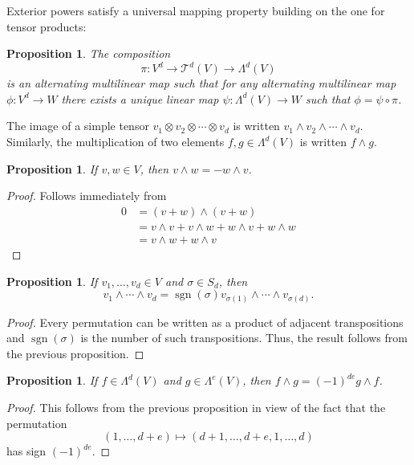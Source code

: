 \documentclass[12pt]{article}
\theoremstyle{plain}
\newtheorem{proposition}[theorem]{Proposition}
\theoremstyle{definition}
\theoremstyle{remark}
\numberwithin{equation}{section}
\begin{document}
Exterior powers satisfy a universal mapping property building on the
one for tensor products:

\begin{proposition}
The composition
\[
\pi : V^d \to \mathcal{T}^d(V) \to \Lambda^d(V)
\]
is an alternating multilinear map such that for any
alternating multilinear map
$\phi : V^d \to W$ there exists a unique linear map
$\psi : \Lambda^d(V) \to W$
such that
$\phi = \psi \circ \pi$.
\end{proposition}

The image of a simple tensor $v_1 \otimes v_2 \otimes \cdots \otimes v_d$
is written $v_1 \wedge v_2 \wedge \cdots \wedge v_d$.
Similarly, the multiplication of two elements $f,g \in \Lambda^d(V)$
is written $f \wedge g$.

\begin{proposition}
If $v,w \in V$, then $v \wedge w = -w \wedge v$.
\end{proposition}

\begin{proof}
Follows immediately from
\begin{align*}
0 &= (v+w) \wedge (v+w)\\
&=v \wedge v + v \wedge w + w \wedge v + w \wedge w\\
&=v \wedge w + w \wedge v
\end{align*}
\end{proof}

\begin{proposition}
If $v_1,\ldots,v_d \in V$ and $\sigma \in S_d$,
then
\[v_1 \wedge \cdots \wedge v_d =
\operatorname{sgn}(\sigma)
v_{\sigma(1)} \wedge \cdots \wedge v_{\sigma(d)}.
\]
\end{proposition}

\begin{proof}
Every permutation can be written as a product of adjacent
transpositions and $\operatorname{sgn}(\sigma)$ is the number of such
transpositions.  Thus, the result follows from the previous proposition.
\end{proof}

\begin{proposition}
If $f \in \Lambda^d(V)$ and $g \in \Lambda^e(V)$,
then $f \wedge g = (-1)^{de} g \wedge f$.
\end{proposition}

\begin{proof}
This follows from the previous proposition in view of the fact that
the permutation
\[
(1,\ldots,d+e) \mapsto (d+1,\ldots,d+e,1,\ldots,d)
\]
has sign $(-1)^{de}$.
\end{proof}
\end{document}
